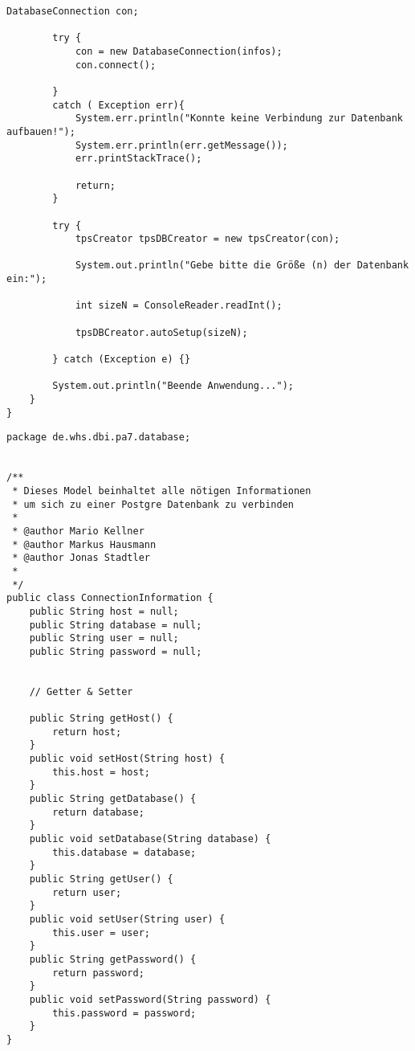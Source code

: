 \begin{lstlisting}[caption={Main}, label={lst:mainv1}]
		DatabaseConnection con;
		
		try {
			con = new DatabaseConnection(infos);
			con.connect();
			
		}
		catch ( Exception err){
			System.err.println("Konnte keine Verbindung zur Datenbank aufbauen!");
			System.err.println(err.getMessage());
			err.printStackTrace();
			
			return;
		}
		
		try {
			tpsCreator tpsDBCreator = new tpsCreator(con);
		
			System.out.println("Gebe bitte die Größe (n) der Datenbank ein:");
			
			int sizeN = ConsoleReader.readInt();
			
			tpsDBCreator.autoSetup(sizeN);
			
		} catch (Exception e) {}
		
		System.out.println("Beende Anwendung...");		
	}
}
\end{lstlisting}


\begin{lstlisting}[caption={ConnectionInformation}, label={lst:civ1}]
package de.whs.dbi.pa7.database;


/**
 * Dieses Model beinhaltet alle nötigen Informationen 
 * um sich zu einer Postgre Datenbank zu verbinden
 * 
 * @author Mario Kellner
 * @author Markus Hausmann
 * @author Jonas Stadtler
 *
 */
public class ConnectionInformation {
	public String host = null;
	public String database = null;
	public String user = null;
	public String password = null;
	
	
	// Getter & Setter
	
	public String getHost() {
		return host;
	}
	public void setHost(String host) {
		this.host = host;
	}
	public String getDatabase() {
		return database;
	}
	public void setDatabase(String database) {
		this.database = database;
	}
	public String getUser() {
		return user;
	}
	public void setUser(String user) {
		this.user = user;
	}
	public String getPassword() {
		return password;
	}
	public void setPassword(String password) {
		this.password = password;
	}
}
\end{lstlisting}


